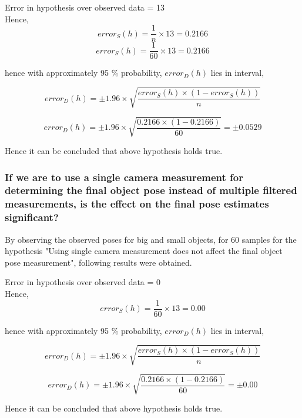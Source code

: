 \vspace{0.5cm}


Error in hypothesis over observed data = 13
\\
Hence,
\\
$$error_{S}(h) = \frac{1}{n} \times 13 = 0.2166$$
$$error_{S}(h) = \frac{1}{60} \times 13 = 0.2166$$

hence with approximately 95 $\%$ probability,
$error_{D}(h)$ lies in interval,

$$error_{D}(h) = \pm 1.96 \times \sqrt{\frac{error_{S}(h) \times (1 - error_{S}(h))}{n}} $$

$$error_{D}(h) = \pm 1.96 \times \sqrt{\frac{0.2166 \times (1 - 0.2166)}{60}} = \pm 0.0529$$

Hence it can be concluded that above hypothesis holds true. 



\subsubsection{If we are to use a single camera measurement for determining the final object pose instead of multiple filtered measurements, is the effect on the final pose estimates significant?}

By observing the observed poses for big and small objects, for 60 samples for the hypothesis "Using single camera measurement does not affect the final object pose measurement", following results were obtained.

\vspace{0.5cm}

Error in hypothesis over observed data = 0
\\
Hence,
\\
$$error_{S}(h) = \frac{1}{60} \times 13 = 0.00$$

hence with approximately 95 $\%$ probability,
$error_{D}(h)$ lies in interval,

$$error_{D}(h) = \pm 1.96 \times \sqrt{\frac{error_{S}(h) \times (1 - error_{S}(h))}{n}} $$

$$error_{D}(h) = \pm 1.96 \times \sqrt{\frac{0.2166 \times (1 - 0.2166)}{60}} = \pm 0.00$$

Hence it can be concluded that above hypothesis holds true. 


